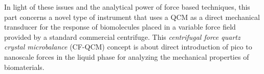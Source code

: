 In light of these issues and the analytical power of force based
techniques, this part concerns a novel type of instrument that uses a QCM
as a direct mechanical transducer for the response of biomolecules placed
in a variable force field provided by a standard commercial centrifuge.
This \textit{centrifugal force quartz crystal microbalance} (CF-QCM)
concept is about direct introduction of pico to nanoscale forces in the
liquid phase for analyzing the mechanical properties of biomaterials.
